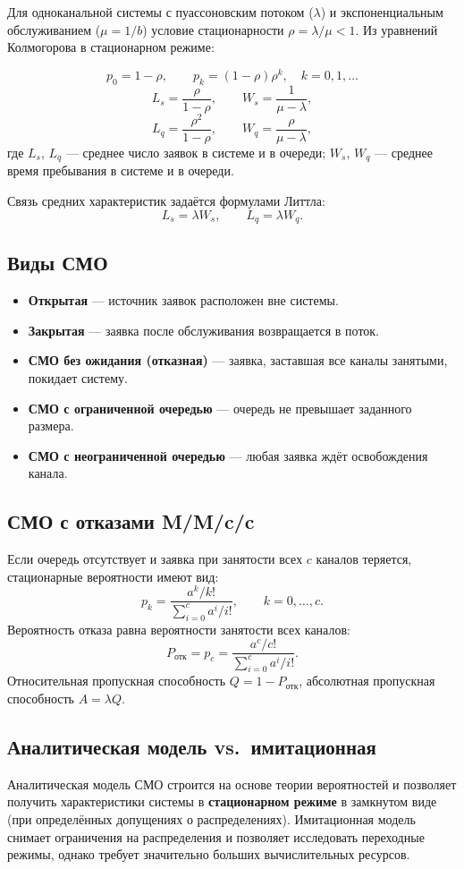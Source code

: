 Для одноканальной системы с пуассоновским потоком ($\lambda$) и экспоненциальным обслуживанием ($\mu = 1/b$) условие стационарности $\rho = \lambda/\mu < 1$. Из уравнений Колмогорова в стационарном режиме:

\[
  p_0 = 1-\rho, \qquad p_k = (1-\rho)\rho^k,\quad k=0,1,\ldots
\]
\[
  L_s = \frac{\rho}{1-\rho}, \qquad
  W_s = \frac{1}{\mu - \lambda},
\]
\[
  L_q = \frac{\rho^2}{1-\rho}, \qquad
  W_q = \frac{\rho}{\mu - \lambda},
\]
где $L_s$, $L_q$ — среднее число заявок в системе и в очереди; $W_s$, $W_q$ — среднее время пребывания в системе и в очереди.

Связь средних характеристик задаётся формулами Литтла:
\[
  L_s = \lambda W_s, \qquad L_q = \lambda W_q.
\]

\subsection*{Виды СМО}

\begin{itemize}
  \item \textbf{Открытая} — источник заявок расположен вне системы.
  \item \textbf{Закрытая} — заявка после обслуживания возвращается в поток.
  \item \textbf{СМО без ожидания (отказная)} — заявка, заставшая все каналы занятыми, покидает систему.
  \item \textbf{СМО с ограниченной очередью} — очередь не превышает заданного размера.
  \item \textbf{СМО с неограниченной очередью} — любая заявка ждёт освобождения канала.
\end{itemize}

\subsection*{СМО с отказами M/M/c/c}

Если очередь отсутствует и заявка при занятости всех $c$ каналов теряется, стационарные вероятности имеют вид:
\[
  p_k = \frac{a^k/k!}{\sum_{i=0}^{c} a^i/i!}, \qquad k=0,\ldots,c.
\]
Вероятность отказа равна вероятности занятости всех каналов:
\[
  P_{\text{отк}} = p_c =
  \frac{a^c/c!}{\sum_{i=0}^{c} a^i/i!}.
\]
Относительная пропускная способность $Q = 1-P_{\text{отк}}$, абсолютная пропускная способность $A = \lambda Q$.

\subsection*{Аналитическая модель vs.\ имитационная}

Аналитическая модель СМО строится на основе теории вероятностей и позволяет получить характеристики системы в \textbf{стационарном режиме} в замкнутом виде (при определённых допущениях о распределениях). Имитационная модель снимает ограничения на распределения и позволяет исследовать переходные режимы, однако требует значительно больших вычислительных ресурсов.

\clearpage
